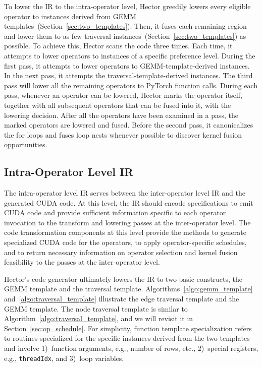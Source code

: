 To lower the IR to the intra-operator level, Hector greedily lowers every eligible operator to instances derived from GEMM templates~(Section~\ref{sec:two_templates}). Then, it fuses each remaining region and lower them to as few traversal instances~(Section~\ref{sec:two_templates}) as possible.
To achieve this, Hector scans the code three times. Each time, it attempts to lower operators to instances of a specific preference level. During the first pass, it attempts to lower operators to GEMM-template-derived instances. In the next pass, it attempts the traversal-template-derived instances. The third pass will lower all the remaining operators to PyTorch function calls.
During each pass, whenever an operator can be lowered, Hector marks the operator itself, together with all subsequent operators that can be fused into it, with the lowering decision. 
After all the operators have been examined in a pass, the marked operators are lowered and fused. Before the second pass, it canonicalizes the for loops and fuses loop nests whenever possible to discover kernel fusion opportunities. 







\subsection{Intra-Operator Level IR}\label{sec:intra-op-ir}


{The} intra-operator level IR serves between the inter-operator level IR and the generated CUDA code. At this level, the IR should encode specifications to emit CUDA code and provide sufficient information specific to each operator invocation to the transform and lowering passes at the inter-operator level. 
The code transformation components at this level provide the methods to generate specialized CUDA code for the operators, to apply operator-specific schedules, and to return necessary information on operator selection and kernel fusion feasibility to the passes at the inter-operator level.

Hector's code generator ultimately lowers the IR to two basic constructs, the GEMM template and the traversal template. 
Algorithms~\ref{algo:gemm_template} and~\ref{algo:traversal_template} illustrate the edge traversal template and the GEMM template. 
The node traversal template is similar to Algorithm~\ref{algo:traversal_template}, and we will revisit it in Section~\ref{sec:op_schedule}.
For simplicity, function template specialization refers to routines specialized for the specific instances derived from the two templates and involve 1)~function arguments, e.g., number of rows, etc., 2)~special registers, e.g., \texttt{threadIdx}, and 3)~loop variables.







